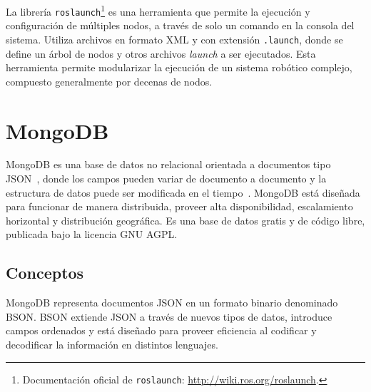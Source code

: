  La librería \texttt{roslaunch}\footnote{Documentación oficial de \texttt{roslaunch}: \url{http://wiki.ros.org/roslaunch}.} es una herramienta que permite la ejecución y configuración de múltiples nodos, a través de solo un comando en la consola del sistema. Utiliza archivos en formato XML y con extensión \texttt{.launch}, donde se define un árbol de nodos y otros archivos \textit{launch} a ser ejecutados. Esta herramienta permite modularizar la ejecución de un sistema robótico complejo, compuesto generalmente por decenas de nodos.



\section{MongoDB}\label{sec:mongodb}

MongoDB es una base de datos no relacional orientada a documentos tipo JSON~\cite{json}, donde los campos pueden variar de documento a documento y la estructura de datos puede ser modificada en el tiempo~\cite{MongoDB}. MongoDB está diseñada para funcionar de manera distribuida, proveer alta disponibilidad, escalamiento horizontal y distribución geográfica. Es una base de datos gratis y de código libre, publicada bajo la licencia GNU AGPL.


\subsection{Conceptos}

MongoDB representa documentos JSON en un formato binario denominado BSON. BSON extiende JSON a través de nuevos tipos de datos, introduce campos ordenados y está diseñado para proveer eficiencia al codificar y decodificar la información en distintos lenguajes. 

